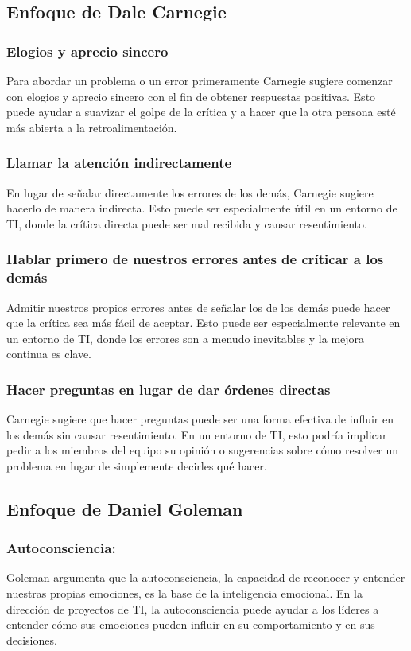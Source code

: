 \documentclass[journal]{IEEEtran}
\begin{document}
\subsection{Enfoque de Dale Carnegie}

\subsubsection{Elogios y aprecio sincero}
Para abordar un problema o un error primeramente Carnegie sugiere comenzar con elogios y aprecio sincero con el fin de obtener respuestas positivas. Esto puede ayudar a suavizar el golpe de la crítica y a hacer que la otra persona esté más abierta a la retroalimentación.

\subsubsection{Llamar la atención indirectamente}
En lugar de señalar directamente los errores de los demás, Carnegie sugiere hacerlo de manera indirecta. Esto puede ser especialmente útil en un entorno de TI, donde la crítica directa puede ser mal recibida y causar resentimiento.
 
\subsubsection{Hablar primero de nuestros errores antes de críticar a los demás}
Admitir nuestros propios errores antes de señalar los de los demás puede hacer que la crítica sea más fácil de aceptar. Esto puede ser especialmente relevante en un entorno de TI, donde los errores son a menudo inevitables y la mejora continua es clave.
 
\subsubsection{Hacer preguntas en lugar de dar órdenes directas}
Carnegie sugiere que hacer preguntas puede ser una forma efectiva de influir en los demás sin causar resentimiento. En un entorno de TI, esto podría implicar pedir a los miembros del equipo su opinión o sugerencias sobre cómo resolver un problema en lugar de simplemente decirles qué hacer.
 
\subsection{Enfoque de Daniel Goleman}
 
\subsubsection{Autoconsciencia:} Goleman argumenta que la autoconsciencia, la capacidad de reconocer y entender nuestras propias emociones, es la base de la inteligencia emocional. En la dirección de proyectos de TI, la autoconsciencia puede ayudar a los líderes a entender cómo sus emociones pueden influir en su comportamiento y en sus decisiones.
\end{document}
